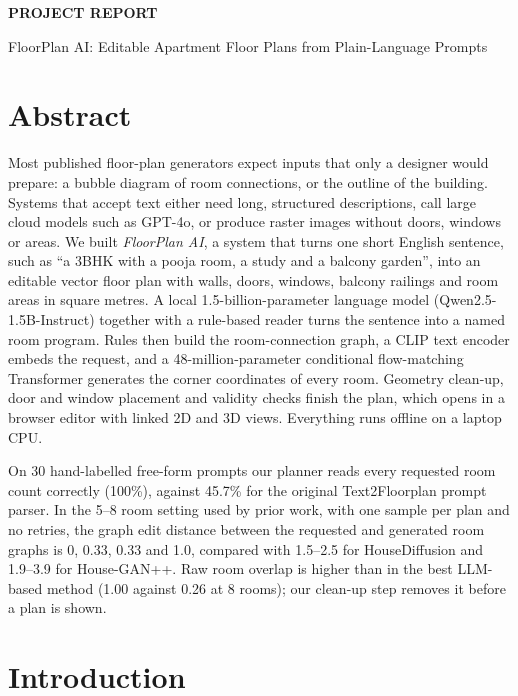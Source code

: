 \documentclass[11pt,a4paper]{article}
\begin{document}
\begin{center}
{\Large\bfseries PROJECT REPORT\par}
\vspace{2pt}
{\large FloorPlan AI: Editable Apartment Floor Plans from Plain-Language Prompts\par}
\end{center}

\section*{Abstract}
Most published floor-plan generators expect inputs that only a designer would
prepare: a bubble diagram of room connections, or the outline of the building.
Systems that accept text either need long, structured descriptions, call large
cloud models such as GPT-4o, or produce raster images without doors, windows or
areas. We built \emph{FloorPlan AI}, a system that turns one short English
sentence, such as ``a 3BHK with a pooja room, a study and a balcony garden'',
into an editable vector floor plan with walls, doors, windows, balcony railings
and room areas in square metres. A local 1.5-billion-parameter language model
(Qwen2.5-1.5B-Instruct) together with a rule-based reader turns the sentence
into a named room program. Rules then build the room-connection graph, a CLIP
text encoder embeds the request, and a 48-million-parameter conditional
flow-matching Transformer generates the corner coordinates of every room.
Geometry clean-up, door and window placement and validity checks finish the
plan, which opens in a browser editor with linked 2D and 3D views. Everything
runs offline on a laptop CPU.

On 30 hand-labelled free-form prompts our planner reads every requested room
count correctly (100\%), against 45.7\% for the original Text2Floorplan prompt
parser. In the 5--8 room setting used by prior work, with one sample per plan
and no retries, the graph edit distance between the requested and generated room
graphs is 0, 0.33, 0.33 and 1.0, compared with 1.5--2.5 for HouseDiffusion and
1.9--3.9 for House-GAN++. Raw room overlap is higher than in the best LLM-based
method (1.00 against 0.26 at 8 rooms); our clean-up step removes it before a
plan is shown.

\section{Introduction}
\end{document}
